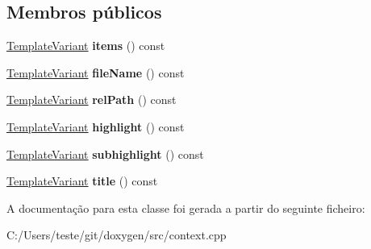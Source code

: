 \subsection*{Membros públicos}
\begin{DoxyCompactItemize}
\item 
\hypertarget{class_example_list_context_1_1_private_a2ea6fc3c0bd7ec3bc5247c1032ff03b7}{\hyperlink{class_template_variant}{Template\-Variant} {\bfseries items} () const }\label{class_example_list_context_1_1_private_a2ea6fc3c0bd7ec3bc5247c1032ff03b7}

\item 
\hypertarget{class_example_list_context_1_1_private_ae9e01c2e41d8bdd7446faf2a1ab28a44}{\hyperlink{class_template_variant}{Template\-Variant} {\bfseries file\-Name} () const }\label{class_example_list_context_1_1_private_ae9e01c2e41d8bdd7446faf2a1ab28a44}

\item 
\hypertarget{class_example_list_context_1_1_private_a68d3623b40481f2d31009257086699e4}{\hyperlink{class_template_variant}{Template\-Variant} {\bfseries rel\-Path} () const }\label{class_example_list_context_1_1_private_a68d3623b40481f2d31009257086699e4}

\item 
\hypertarget{class_example_list_context_1_1_private_ab088f4d955499ca1d67c286a117e5bfe}{\hyperlink{class_template_variant}{Template\-Variant} {\bfseries highlight} () const }\label{class_example_list_context_1_1_private_ab088f4d955499ca1d67c286a117e5bfe}

\item 
\hypertarget{class_example_list_context_1_1_private_ade53cb2b5272274e0736e78a27b75c5b}{\hyperlink{class_template_variant}{Template\-Variant} {\bfseries subhighlight} () const }\label{class_example_list_context_1_1_private_ade53cb2b5272274e0736e78a27b75c5b}

\item 
\hypertarget{class_example_list_context_1_1_private_a5732df72750a31555da8a10f5788ef02}{\hyperlink{class_template_variant}{Template\-Variant} {\bfseries title} () const }\label{class_example_list_context_1_1_private_a5732df72750a31555da8a10f5788ef02}

\end{DoxyCompactItemize}


A documentação para esta classe foi gerada a partir do seguinte ficheiro\-:\begin{DoxyCompactItemize}
\item 
C\-:/\-Users/teste/git/doxygen/src/context.\-cpp\end{DoxyCompactItemize}

